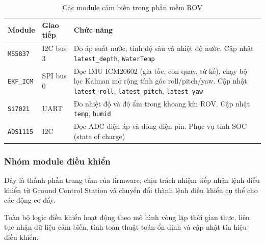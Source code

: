 \documentclass[../DoAn.tex]{subfiles}
\begin{document}
\begin{table}[H]

\centering

\renewcommand{\arraystretch}{1.3}

\begin{tabular}{|l|l|p{6cm}|}

\hline

\textbf{Module} & \textbf{Giao tiếp} & \textbf{Chức năng} \\

\hline

\texttt{MS5837} & I2C bus 3 &
Đo áp suất nước, tính độ sâu và nhiệt độ nước. Cập nhật \texttt{latest\_depth}, \texttt{WaterTemp} \\

\hline

\texttt{EKF\_ICM} & SPI bus 0 &
Đọc IMU ICM20602 (gia tốc, con quay, từ kế), chạy bộ lọc
Kalman mở rộng tính góc roll/pitch/yaw. Cập nhật \texttt{latest\_roll}, \texttt{latest\_pitch}, \texttt{latest\_yaw} \\

\hline

\texttt{Si7021} & UART & Đo nhiệt độ và độ ẩm trong khoang kín ROV. Cập nhật \texttt{temp}, \texttt{humid} \\

\hline

\texttt{ADS1115} & I2C & Đọc ADC điện áp và dòng điện pin. Phục vụ tính SOC (state of charge) \\

\hline

\end{tabular}

\caption{Các module cảm biến trong phần mềm ROV}

\label{tab:sensor_modules}

\end{table}

\subsubsection{Nhóm module điều khiển}

Đây là thành phần trung tâm của firmware, chịu trách nhiệm tiếp nhận
lệnh điều khiển từ Ground Control Station và chuyển đổi thành lệnh điều
khiển cụ thể cho các động cơ đẩy.

Toàn bộ logic điều khiển hoạt động theo mô hình vòng lặp thời gian thực,
liên tục nhận dữ liệu cảm biến, tính toán thuật toán ổn định và cập nhật
tín hiệu điều khiển.
\end{document}
